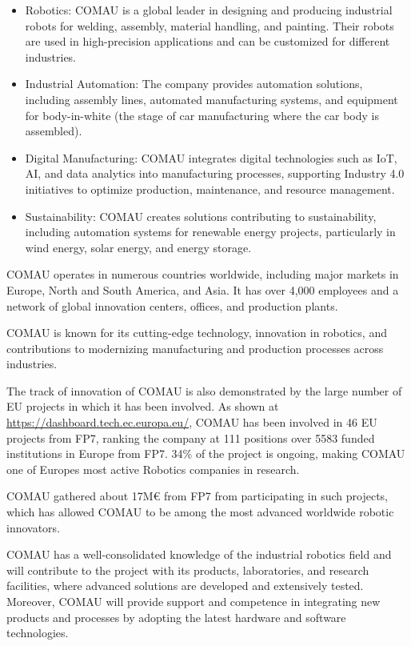 \begin{itemize}
\item
  Robotics: COMAU is a global leader in designing and producing
  industrial robots for welding, assembly, material handling, and
  painting. Their robots are used in high-precision applications and can
  be customized for different industries.
\item
  Industrial Automation: The company provides automation solutions,
  including assembly lines, automated manufacturing systems, and
  equipment for body-in-white (the stage of car manufacturing where the
  car body is assembled).
\item
  Digital Manufacturing: COMAU integrates digital technologies such as
  IoT, AI, and data analytics into manufacturing processes, supporting
  Industry 4.0 initiatives to optimize production, maintenance, and
  resource management.
\item
  Sustainability: COMAU creates solutions contributing to
  sustainability, including automation systems for renewable energy
  projects, particularly in wind energy, solar energy, and energy
  storage.
\end{itemize}

COMAU operates in numerous countries worldwide, including major markets
in Europe, North and South America, and Asia. It has over 4,000
employees and a network of global innovation centers, offices, and
production plants.

COMAU is known for its cutting-edge technology, innovation in robotics,
and contributions to modernizing manufacturing and production processes
across industries.

The track of innovation of COMAU is also demonstrated by the large
number of EU projects in which it has been involved. As shown at
\url{https://dashboard.tech.ec.europa.eu/}, COMAU has been involved in 46 EU
projects from FP7, ranking the company at 111 positions over 5583 funded
institutions in Europe from FP7. 34\% of the project is ongoing, making
COMAU one of Europe\textquotesingle s most active Robotics companies in
research.

COMAU gathered about 17M€ from FP7 from participating in such projects,
which has allowed COMAU to be among the most advanced worldwide robotic
innovators.

COMAU has a well-consolidated knowledge of the industrial robotics field
and will contribute to the project with its products, laboratories, and
research facilities, where advanced solutions are developed and
extensively tested. Moreover, COMAU will provide support and competence
in integrating new products and processes by adopting the latest
hardware and software technologies.

